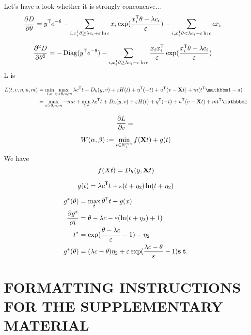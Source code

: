 Let's have a look whether it is strongly conconcave...
$$
\begin{aligned}
\frac{\partial D}{\partial \theta} &=  y^{\mathsf T}e^{-\theta} -  \sum_{i,x_i^{\mathsf T}\theta\geq\lambda c_i +\varepsilon\ln \epsilon} x_i\exp(\frac{x_i^{\mathsf T}\theta-\lambda c_i}{\varepsilon}) -\sum_{i,x_i^{\mathsf T}\theta<\lambda c_i +\varepsilon\ln \epsilon} \epsilon x_i
\end{aligned}
$$

$$
\begin{aligned}
\frac{\partial^{2} D}{\partial \theta^{2}} &=  -\operatorname{Diag}(y^{\mathsf T}e^{-\theta}) -  \sum_{i,x_i^{\mathsf T}\theta\geq\lambda c_i +\varepsilon\ln \epsilon} \frac{x_i x_i^{\mathsf T}}{\varepsilon}\exp(\frac{x_i^{\mathsf T}\theta-\lambda c_i}{\varepsilon})
\end{aligned}
$$
L is

$$
\begin{aligned}
L(t,v,\eta,u,m) &= \min_{t,v} \max_{\eta>0,u,m} \lambda c^{\tranT}t + D_h(y,v) + \varepsilon H(t) + \eta ^{\tranT} (-t) +u^{\tranT}(v-\X t) + m( t^{\tranT}\one - a)\\
&= \max_{\eta>0,u,m} -ma + \min_{t,v}  \lambda c^{\tranT}t + D_h(y,v) + \varepsilon H(t) + \eta ^{\tranT} (-t) +u^{\tranT}(v-\X t) + m t^{\tranT}\one 
\end{aligned}
$$

\begin{equation}
\frac{\partial L}{\partial v} = 
\end{equation}

\begin{equation}
W(\alpha,\beta) := \min_{t \in \mathbb{R}_{+}^{mn}} f(\mathbf{X} t) + g(t)
\end{equation}
We have 
$$
f(Xt) = D_h(y,\mathbf{X} t) 
$$

$$
g(t) = \lambda c^{\mathsf T}t +  \varepsilon (t +\eta_2) \ln (t+\eta_2)
$$

$$
\begin{aligned}
g^*(\theta) &= \max_{t} \theta^{\mathsf T} t - g(x)\\
\frac{\partial g^*}{\partial t} &= \theta - \lambda c - \varepsilon(\ln (t+\eta_2)+1) \\
t^* &= \exp (\frac{\theta - \lambda c}{\varepsilon}-1) - \eta_2\\
g^*(\theta) &= (\lambda c-\theta)\eta_2 + \varepsilon \exp(\frac{\lambda c-\theta}{\varepsilon}-1)
\mathbf{s.t.} 
\end{aligned}
$$

\section{FORMATTING INSTRUCTIONS FOR THE SUPPLEMENTARY MATERIAL}

